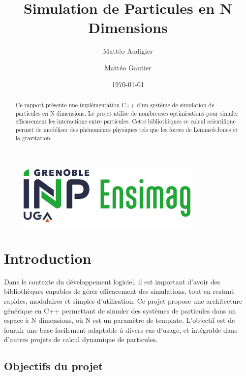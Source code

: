 \documentclass[12pt,a4paper]{article}
\title{Simulation de Particules en N Dimensions}
\author{Mattéo Audigier \and Mattéo Gautier}
\date{\today}
\begin{document}
\maketitle

\begin{abstract}
Ce rapport présente une implémentation C++ d'un système de simulation de particules en N dimensions. Le projet utilise de nombreuses optimisations pour simuler efficacement les interactions entre particules. Cette bibliothèques ce calcul scientifique permet de modéliser des phénomènes physiques tels que les forces de Lennard-Jones et la gravitation.
\end{abstract}

\vspace{5cm}

\begin{figure}[H]
\centering
\includegraphics[width=0.8\textwidth]{assets/ensimag.png}
\end{figure}

\newpage

\tableofcontents

\newpage

\section{Introduction}

Dans le contexte du développement logiciel, il est important d'avoir des bibliothèques capables de gérer efficacement des simulations, tout en restant rapides, modulaires et simples d'utilisation. Ce projet propose une architecture générique en C++ permettant de simuler des systèmes de particules dans un espace à N dimensions, où N est un paramètre de template. L'objectif est de fournir une base facilement adaptable à divers cas d'usage, et intégrable dans d'autres projets de calcul dynamique de particules.

\subsection{Objectifs du projet}
\end{document}
